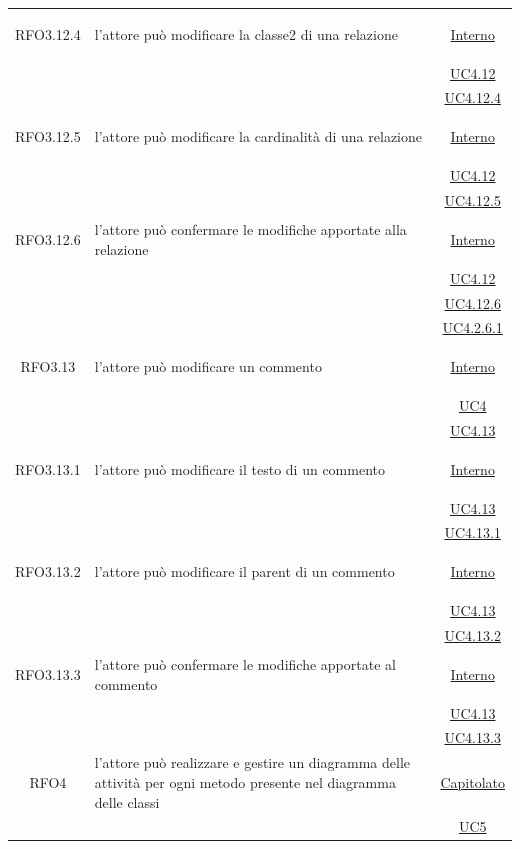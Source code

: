 \begin{itemize}
\begin{itemize}
\begin{itemize}
\begin{itemize}
\begin{longtable}{|c|>{\centering}m{7cm}|c|}
\hypertarget{RFO3.12.4}{RFO3.12.4} & l'attore può modificare la classe2 di una relazione &  \hyperlink{Interno}{Interno}\\
& &\hyperref[UC4.12]{UC4.12}\\
& &\hyperref[UC4.12.4]{UC4.12.4}\\ \hline

\hypertarget{RFO3.12.5}{RFO3.12.5} & l'attore può modificare la cardinalità di una relazione &  \hyperlink{Interno}{Interno}\\
& &\hyperref[UC4.12]{UC4.12}\\
& &\hyperref[UC4.12.5]{UC4.12.5}\\ \hline

\hypertarget{RFO3.12.6}{RFO3.12.6} & l'attore può confermare le modifiche apportate alla relazione &  \hyperlink{Interno}{Interno}\\
& &\hyperref[UC4.12]{UC4.12}\\
& &\hyperref[UC4.12.6]{UC4.12.6}\\
& &\hyperref[UC4.2.6.1]{UC4.2.6.1}\\ \hline

\hypertarget{RFO3.13}{RFO3.13} & l'attore può modificare un commento &  \hyperlink{Interno}{Interno}\\
& &\hyperref[UC4]{UC4}\\
& &\hyperref[UC4.13]{UC4.13}\\ \hline

\hypertarget{RFO3.13.1}{RFO3.13.1} & l'attore può modificare il testo di un commento &  \hyperlink{Interno}{Interno}\\
& &\hyperref[UC4.13]{UC4.13}\\
& &\hyperref[UC4.13.1]{UC4.13.1}\\ \hline

\hypertarget{RFO3.13.2}{RFO3.13.2} & l'attore può modificare il parent di un commento &  \hyperlink{Interno}{Interno}\\
& &\hyperref[UC4.13]{UC4.13}\\
& &\hyperref[UC4.13.2]{UC4.13.2}\\ \hline

\hypertarget{RFO3.13.3}{RFO3.13.3} & l'attore può confermare le modifiche apportate al commento &  \hyperlink{Interno}{Interno}\\
& &\hyperref[UC4.13]{UC4.13}\\
& &\hyperref[UC4.13.3]{UC4.13.3}\\ \hline

\hypertarget{RFO4}{RFO4} & l'attore può realizzare e gestire un diagramma delle attività per ogni metodo presente nel diagramma delle classi & \hyperlink{Capitolato}{Capitolato}\\
& & \hyperref[UC5]{UC5}\\ \hline


\end{longtable}
\end{itemize}
\end{itemize}
\end{itemize}
\end{itemize}
